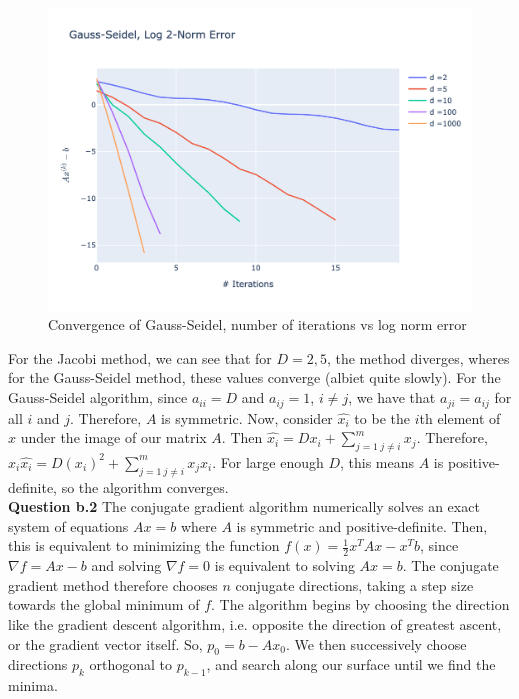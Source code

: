 \documentclass{article}
\begin{document}
\begin{figure}[H]
  \centering
  \includegraphics[width=\linewidth]{images/gauss_seidel_error.png}  
  \caption{Convergence of Gauss-Seidel, number of iterations vs log norm error}
\end{figure}

For the Jacobi method, we can see that for $D = 2,5$, the method diverges, wheres for the Gauss-Seidel method, these values converge (albiet quite slowly). For the Gauss-Seidel algorithm, since $a_{ii} = D$ and $a_{ij} = 1$, $i \neq j$, we have that $a_{ji}=a_{ij}$ for all $i$ and $j$. Therefore, $A$ is symmetric. Now, consider $\hat{x_i}$ to be the $i$th element of $x$ under the image of our matrix $A$. Then $\hat{x_i} = Dx_i+\sum_{j=1 \ j \neq i}^m x_j$. Therefore, $x_i \hat{x_i} = D(x_i)^2 +\sum_{j=1 \ j \neq i}^m x_jx_i$. For large enough $D$, this means $A$ is positive-definite, so the algorithm converges. \\

\textbf{Question b.2} 
The conjugate gradient algorithm numerically solves an exact system of equations $Ax = b$ where $A$ is symmetric and positive-definite. Then, this is equivalent to minimizing the function $f(x) = \frac{1}{2}x^T Ax-x^Tb$, since $\nabla f = Ax - b$ and solving $\nabla f = 0$ is equivalent to solving $Ax=b$. The conjugate gradient method therefore chooses $n$ conjugate directions, taking a step size towards the global minimum of $f$. The algorithm begins by choosing the direction like the gradient descent algorithm, i.e. opposite the direction of greatest ascent, or the gradient vector itself. So, $p_0 = b-Ax_0$. We then successively choose directions $p_k$ orthogonal to $p_{k-1}$, and search along our surface until we find the minima. \\
\end{document}

